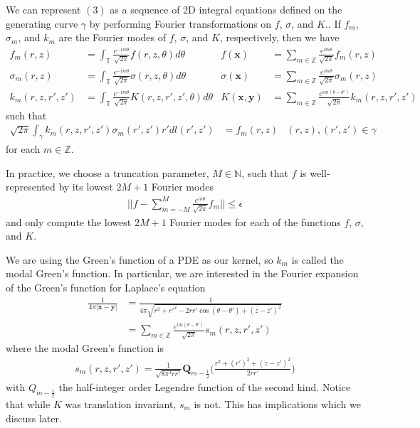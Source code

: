 \documentclass[11pt, oneside]{article}   	%
\begin{document}
We can represent $(3)$ as a sequence of 2D integral equations defined on the generating curve $\gamma$ by performing Fourier transformations on $f$, $\sigma$, and $K$.. If $f_m$, $\sigma_m$, and $k_m$ are the Fourier modes of $f$, $\sigma$, and $K$, respectively, then we have
\begin{align*}
f_m(r,z)&=\int_\mathbb{T}\frac{e^{-im\theta}}{\sqrt{2\pi}}f(r,z,\theta)d\theta&f(\mathbf{x})&=\sum_{m\in\mathbb{Z}}\frac{e^{im\theta}}{\sqrt{2\pi}}f_m(r,z)\\
\sigma_m(r,z)&=\int_\mathbb{T}\frac{e^{-im\theta}}{\sqrt{2\pi}}\sigma(r,z,\theta)d\theta&\sigma(\mathbf{x})&=\sum_{m\in\mathbb{Z}}\frac{e^{im\theta}}{\sqrt{2\pi}}\sigma_m(r,z)\\
k_m(r,z,r',z')&=\int_\mathbb{T}\frac{e^{-im\theta}}{\sqrt{2\pi}}K(r,z,r',z',\theta)d\theta&K(\mathbf{x},\mathbf{y})&=\sum_{m\in\mathbb{Z}}\frac{e^{im(\theta-\theta')}}{\sqrt{2\pi}}k_m(r,z,r',z')
\end{align*}
such that
\begin{align}
\sqrt{2\pi}\int_\gamma k_m(r,z,r',z')\sigma_m(r',z')r'dl(r',z')&=f_m(r,z) &(r,z),(r',z')\in\gamma
\end{align}
for each $m\in\mathbb{Z}$.

In practice, we choose a truncation parameter, $M\in\mathbb{N}$, such that $f$ is well-represented by its lowest $2M+1$ Fourier modes
\begin{align}
||f-\sum\limits_{m=-M}^{M}\frac{e^{in\theta}}{\sqrt{2\pi}}f_m||\le\epsilon
\end{align}
and only compute the lowest $2M+1$ Fourier modes for each of the functions $f$, $\sigma$, and $K$.

We are using the Green's function of a PDE as our kernel, so $k_m$ is called the modal Green's function. In particular, we are interested in the Fourier expansion of the Green's function for Laplace's equation
\begin{align}
\frac{1}{4\pi |\mathbf{x}-\mathbf{y}|} &=\frac{1}{4\pi\sqrt{r^2+r'^2-2rr'\cos{(\theta-\theta')}+(z-z')^2}}\\
&= \sum_{m\in\mathbb{Z}} \frac{e^{im(\theta-\theta')}}{\sqrt{2\pi}} s_m(r,z,r',z')
\end{align}
where the modal Green's function is
\begin{align}
s_m(r,z,r',z')=\frac{1}{\sqrt{8\pi^3 rr'}}\mathbf{Q}_{m-\frac{1}{2}}\bigg(\frac{r^2+(r')^2+(z-z')^2}{2rr'}\bigg)
\end{align}
with $Q_{m-\frac{1}{2}}$ the half-integer order Legendre function of the second kind. Notice that while $K$ was translation invariant, $s_m$ is not. This has implications which we discuss later.
\end{document}
